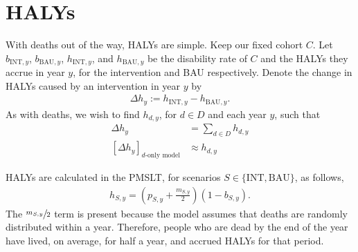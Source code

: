 \documentclass[]{article}
\begin{document}
\section{HALYs}

With deaths out of the way, HALYs are simple. Keep our fixed cohort $C$. Let $b_{\text{INT}, y}$, $b_{\text{BAU}, y}$, $h_{\text{INT}, y}$, and $h_{\text{BAU}, y}$ be the disability rate of $C$ and the HALYs they accrue in year $y$, for the intervention and BAU respectively. Denote the change in HALYs caused by an intervention in year $y$ by
\begin{align*}
	\Delta h_y := h_{\text{INT}, y} - h_{\text{BAU}, y}.
\end{align*}
As with deaths, we wish to find $h_{d, y}$, for $d \in D$ and each year $y$, such that
\begin{align*}
	\Delta h_y &= \sum_{d \in D} h_{d, y} \\
	[\Delta h_y]_\text{$d$-only model} &\approx h_{d, y}
\end{align*}

HALYs are calculated in the PMSLT, for scenarios $S \in \{\text{INT}, \text{BAU}\}$, as follows,
\begin{align*}
	h_{S, y} = \left(p_{S, y} + \frac{m_{S, y}}{2}\right) (1 - b_{S, y}).
\end{align*}
The $\sfrac{m_{S, y}}{2}$ term is present because the model assumes that deaths are randomly distributed within a year. Therefore, people who are dead by the end of the year have lived, on average, for half a year, and accrued HALYs for that period.
\end{document}

